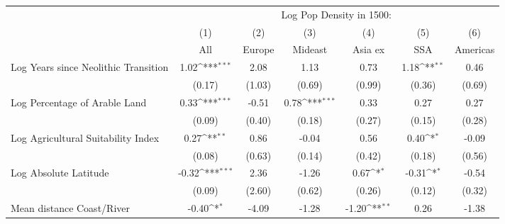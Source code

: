 {
\def\sym#1{\ifmmode^{#1}\else\(^{#1}\)\fi}
\begin{tabular}{l*{6}{c}}
\toprule
                    &\multicolumn{6}{c}{Log Pop Density in 1500:}                                                                                       \\
                    &\multicolumn{1}{c}{(1)}         &\multicolumn{1}{c}{(2)}         &\multicolumn{1}{c}{(3)}         &\multicolumn{1}{c}{(4)}         &\multicolumn{1}{c}{(5)}         &\multicolumn{1}{c}{(6)}         \\
                    &         All         &      Europe         &     Mideast         &     Asia ex         &         SSA         &    Americas         \\
\midrule
Log Years since Neolithic Transition&        1.02\sym{***}&        2.08         &        1.13         &        0.73         &        1.18\sym{**} &        0.46         \\
                    &      (0.17)         &      (1.03)         &      (0.69)         &      (0.99)         &      (0.36)         &      (0.69)         \\
\addlinespace
Log Percentage of Arable Land&        0.33\sym{***}&       -0.51         &        0.78\sym{***}&        0.33         &        0.27         &        0.27         \\
                    &      (0.09)         &      (0.40)         &      (0.18)         &      (0.27)         &      (0.15)         &      (0.28)         \\
\addlinespace
Log Agricultural Suitability Index&        0.27\sym{**} &        0.86         &       -0.04         &        0.56         &        0.40\sym{*}  &       -0.09         \\
                    &      (0.08)         &      (0.63)         &      (0.14)         &      (0.42)         &      (0.18)         &      (0.56)         \\
\addlinespace
Log Absolute Latitude&       -0.32\sym{***}&        2.36         &       -1.26         &        0.67\sym{*}  &       -0.31\sym{*}  &       -0.54         \\
                    &      (0.09)         &      (2.60)         &      (0.62)         &      (0.26)         &      (0.12)         &      (0.32)         \\
\addlinespace
Mean distance Coast/River&       -0.40\sym{*}  &       -4.09         &       -1.28         &       -1.20\sym{**} &        0.26         &       -1.38         \\

\end{tabular}}

